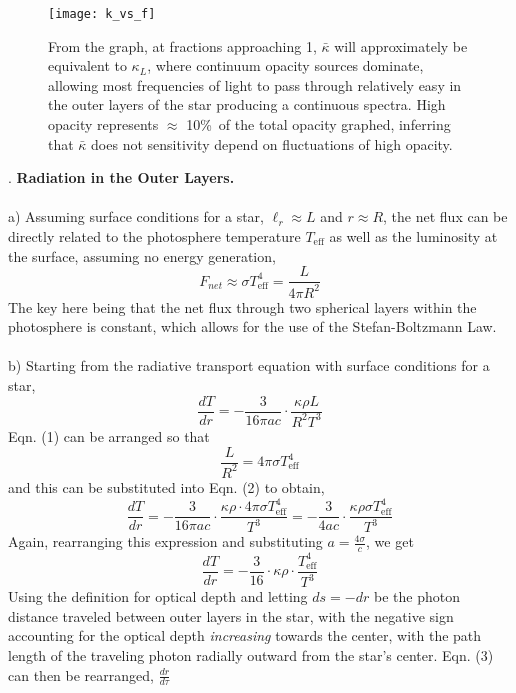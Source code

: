\documentclass[14pt]{extarticle}
\begin{document}
\pagebreak

\pagebreak
\pagebreak
\begin{figure}[H]
	\centerline{\texttt{[image: k\_vs\_f]}}
	From the graph, at fractions approaching 1, $\bar{\kappa}$ will approximately be equivalent to $\kappa_L$, where continuum opacity sources dominate, allowing most frequencies of light to pass through relatively easy in the outer layers of the star producing a continuous spectra. High opacity represents $\approx$ 10\%\ of the total opacity graphed, inferring that $\bar{\kappa}$ does not sensitivity depend on fluctuations of high opacity.
\end{figure} 
. \textbf{ Radiation in the Outer Layers.} \\ \\
a) Assuming surface conditions for a star, $\ell_r \approx L$ and $r \approx R$, the net flux can be directly related to the photosphere temperature $T_{\text{eff}}$ as well as the luminosity at the surface, assuming no energy generation,
\begin{equation} \tag{1}
F_{net} \approx \sigma T^{4}_{\text{eff}} = \frac{L}{4\pi R^2}
\end{equation} 
The key here being that the net flux through two spherical layers within the photosphere is constant, which allows for the use of the Stefan-Boltzmann Law. \\ \\
b) Starting from the radiative transport equation with surface conditions for a star,
\begin{equation} \tag{2}
\frac{dT}{dr} = -\frac{3}{16\pi ac} \cdot \frac{\kappa \rho L}{R^2T^3}
\end{equation}
Eqn. (1) can be arranged so that 
$$ \frac{L}{R^2} = 4\pi\sigma T_{\text{eff}}^4 $$
and this can be substituted into Eqn. (2) to obtain,
$$ \frac{dT}{dr} = - \frac{3}{16\pi ac} \cdot \frac{\kappa \rho \cdot 4\pi\sigma T^{4}_{\text{eff}}}{T^3} = -\frac{3}{4ac}\cdot\frac{\kappa \rho \sigma T^{4}_{\text{eff}}}{T^3} $$ 
Again, rearranging this expression and substituting $a=\frac{4\sigma}{c}$, we get
\begin{equation} \tag{3}
\frac{dT}{dr} = - \frac{3}{16} \cdot \kappa\rho \cdot \frac{T^{4}_{\text{eff}}}{T^3}
\end{equation}
Using the definition for optical depth and letting $ds = -dr$ be the photon distance traveled between outer layers in the star, with the negative sign accounting for the optical depth \textit{increasing} towards the center, with the path length of the traveling photon radially outward from the star's center. Eqn. (3) can then be rearranged, $\frac{dr}{d\tau}$
\end{document}
